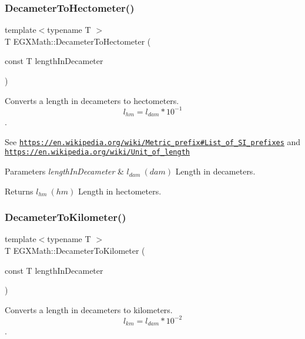 \subsubsection{\texorpdfstring{Decameter\+To\+Hectometer()}{DecameterToHectometer()}}
{\footnotesize\ttfamily template$<$typename T $>$ \\
T E\+G\+X\+Math\+::\+Decameter\+To\+Hectometer (\begin{DoxyParamCaption}\item[{const T}]{length\+In\+Decameter }\end{DoxyParamCaption})}



Converts a length in decameters to hectometers. \[ l_{hm}=l_{dam} * 10^{-1} \]. 

See \href{https://en.wikipedia.org/wiki/Metric_prefix#List_of_SI_prefixes}{\tt https\+://en.\+wikipedia.\+org/wiki/\+Metric\+\_\+prefix\#\+List\+\_\+of\+\_\+\+S\+I\+\_\+prefixes} and \href{https://en.wikipedia.org/wiki/Unit_of_length}{\tt https\+://en.\+wikipedia.\+org/wiki/\+Unit\+\_\+of\+\_\+length} 
\begin{DoxyParams}{Parameters}
{\em length\+In\+Decameter} & $ l_{dam}\ (dam)$ Length in decameters. \\
\hline
\end{DoxyParams}
\begin{DoxyReturn}{Returns}
$ l_{hm}\ (hm)$ Length in hectometers. 
\end{DoxyReturn}
\mbox{\label{group___e_g_x_math-_conversions-_length_conversions-_decameter-_s_i_gaecb6cb385676cad8430d23e529e4a59e}} 
\subsubsection{\texorpdfstring{Decameter\+To\+Kilometer()}{DecameterToKilometer()}}
{\footnotesize\ttfamily template$<$typename T $>$ \\
T E\+G\+X\+Math\+::\+Decameter\+To\+Kilometer (\begin{DoxyParamCaption}\item[{const T}]{length\+In\+Decameter }\end{DoxyParamCaption})}



Converts a length in decameters to kilometers. \[ l_{km}=l_{dam} * 10^{-2} \]. 

